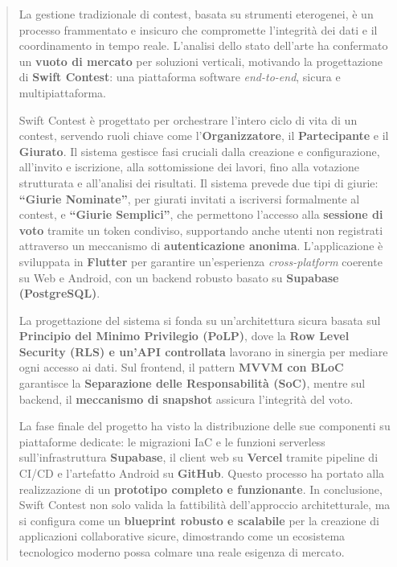 \begin{titlepage}
    \begin{abstract}
        La gestione tradizionale di contest, basata su strumenti eterogenei, è un processo frammentato e insicuro che compromette l’integrità dei dati e il coordinamento in tempo reale.
        L'analisi dello stato dell'arte ha confermato un \textbf{vuoto di mercato} per soluzioni verticali, motivando la progettazione di \textbf{Swift Contest}: una piattaforma software \emph{end-to-end}, sicura e multipiattaforma.

        Swift Contest è progettato per orchestrare l'intero ciclo di vita di un contest, servendo ruoli chiave come l'\textbf{Organizzatore}, il \textbf{Partecipante} e il \textbf{Giurato}.
        Il sistema gestisce fasi cruciali dalla creazione e configurazione, all'invito e iscrizione, alla sottomissione dei lavori, fino alla votazione strutturata e all'analisi dei risultati.
        Il sistema prevede due tipi di giurie: \textbf{``Giurie Nominate''}, per giurati invitati a iscriversi formalmente al contest, e \textbf{``Giurie Semplici''}, che permettono l'accesso alla \textbf{sessione di voto} tramite un token condiviso, supportando anche utenti non registrati attraverso un meccanismo di \textbf{autenticazione anonima}.
        L'applicazione è sviluppata in \textbf{Flutter} per garantire un'esperienza \emph{cross-platform} coerente su Web e Android, con un backend robusto basato su \textbf{Supabase (PostgreSQL)}.

        La progettazione del sistema si fonda su un’architettura sicura basata sul \textbf{Principio del Minimo Privilegio (PoLP)}, dove la \textbf{Row Level Security (RLS) e un'API controllata} lavorano in sinergia per mediare ogni accesso ai dati.
        Sul frontend, il pattern \textbf{MVVM con BLoC} garantisce la \textbf{Separazione delle Responsabilità (SoC)}, mentre sul backend, il \textbf{meccanismo di snapshot} assicura l’integrità del voto.

        La fase finale del progetto ha visto la distribuzione delle sue componenti su piattaforme dedicate: le migrazioni IaC e le funzioni serverless sull'infrastruttura \textbf{Supabase}, il client web su \textbf{Vercel} tramite pipeline di CI/CD e l'artefatto Android su \textbf{GitHub}.
        Questo processo ha portato alla realizzazione di un \textbf{prototipo completo e funzionante}.
        In conclusione, Swift Contest non solo valida la fattibilità dell'approccio architetturale, ma si configura come un \textbf{blueprint robusto e scalabile} per la creazione di applicazioni collaborative sicure, dimostrando come un ecosistema tecnologico moderno possa colmare una reale esigenza di mercato.
    \end{abstract}
\end{titlepage}